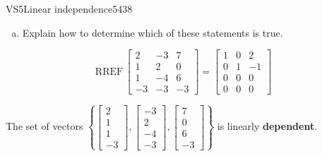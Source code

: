 \begin{exercise}{VS5}{Linear independence}{5438}
\begin{exerciseStatement}
\begin{enumerate}[(a)]
     
\item  

 Explain how to determine which of these statements is true. 

 
\end{enumerate}

     \end{exerciseStatement}
 \begin{exerciseAnswer} 

 \[
\mathrm{RREF}\, \left[\begin{array}{ccc}
2 & -3 & 7 \\
1 & 2 & 0 \\
1 & -4 & 6 \\
-3 & -3 & -3
\end{array}\right] = \left[\begin{array}{ccc}
1 & 0 & 2 \\
0 & 1 & -1 \\
0 & 0 & 0 \\
0 & 0 & 0
\end{array}\right]
            \] 

 

 The set of vectors \(\left\{ \left[\begin{array}{c}
2 \\
1 \\
1 \\
-3
\end{array}\right] , \left[\begin{array}{c}
-3 \\
2 \\
-4 \\
-3
\end{array}\right] , \left[\begin{array}{c}
7 \\
0 \\
6 \\
-3
\end{array}\right] \right\}\) is linearly \textbf{dependent}. 

 \end{exerciseAnswer}
 \end{exercise}


